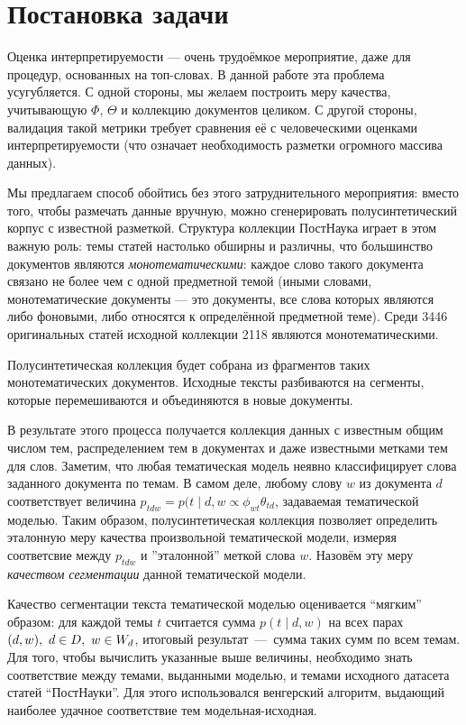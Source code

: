 \section{Постановка задачи}

Оценка интерпретируемости --- очень трудоёмкое мероприятие, даже для процедур, основанных на топ-словах. 
В данной работе эта проблема усугубляется. С одной стороны, мы желаем построить меру качества, учитывающую $\Phi$, $\Theta$ и коллекцию документов целиком. С другой стороны, валидация такой метрики требует сравнения её с человеческими оценками интерпретируемости (что означает необходимость разметки огромного массива данных).

Мы предлагаем способ обойтись без этого затруднительного мероприятия: вместо того, чтобы размечать данные вручную, можно сгенерировать полусинтетический корпус с известной разметкой. Структура коллекции ПостНаука играет в этом важную роль: темы статей настолько обширны и различны, что большинство документов являются \textit{монотематическими}: каждое слово такого документа связано не более чем с одной предметной темой (иными словами, монотематические документы --- это документы, все слова которых являются либо фоновыми, либо относятся к определённой предметной теме). Среди 3446 оригинальных статей исходной коллекции 2118 являются монотематическими. 

Полусинтетическая коллекция будет собрана из фрагментов таких монотематических документов. Исходные тексты разбиваются на сегменты, которые перемешиваются и объединяются в новые документы.


В результате этого процесса получается коллекция данных с известным общим числом тем, распределением тем в документах и даже известными метками тем для слов. Заметим, что любая тематическая модель неявно классифицирует слова заданного документа по темам. В самом деле, любому слову $w$ из документа $d$ соответствует величина $p_{tdw} = p(t \mid d, w \propto \phi_{wt}\theta_{td}$, задаваемая тематической моделью. Таким образом, полусинтетическая коллекция позволяет определить эталонную меру качества произвольной тематической модели, измеряя соответсвие между $p_{tdw}$ и ''эталонной'' меткой слова $w$. Назовём эту меру \textit{качеством сегментации} данной тематической модели. 
  
Качество сегментации текста тематической моделью оценивается ``мягким'' образом: для каждой темы $t$ считается сумма $p(t \mid d, w)$ на всех парах $(d, w),\ d \hm\in D,\ w \hm\in W_d$, итоговый результат~---~сумма таких сумм по всем темам. Для того, чтобы вычислить указанные выше величины, необходимо знать соответствие между темами, выданными моделью, и темами исходного датасета статей ``ПостНауки''. Для этого использовался венгерский алгоритм, выдающий наиболее удачное соответствие тем модельная-исходная.

